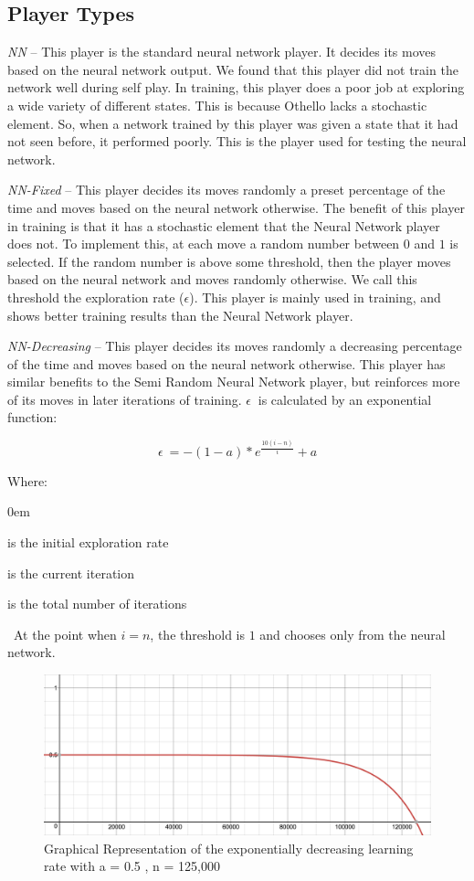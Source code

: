 \documentclass{sig-alternate-05-2015}
\begin{document}
\subsection{Player Types}
\emph{NN} -- This player is the standard neural network player. It decides its moves based on the neural network output. We found that this player did not train the network well during self play. In training, this player does a poor job at exploring a wide variety of different states. This is because Othello lacks a stochastic element. So, when a network trained by this player was given a state that it had not seen before, it performed poorly. This is the player used for testing the neural network.

\emph{NN-Fixed} -- This player decides its moves randomly a preset percentage of the time and moves based on the neural network otherwise. The benefit of this player in training is that it has a stochastic element that the Neural Network player does not. To implement this, at each move a random number between $0$ and $1$ is selected. If the random number is above some threshold, then the player moves based on the neural network and moves randomly otherwise. We call this threshold the exploration rate (\(\epsilon\)). This player is mainly used in training, and shows better training results than the Neural Network player.

\emph{NN-Decreasing} -- This player decides its moves randomly a decreasing percentage of the time and moves based on the neural network otherwise. This player has similar benefits to the Semi Random Neural Network player, but reinforces more of its moves in later iterations of training. $\epsilon\ $ is calculated by an exponential function:

\begin{equation}
\epsilon\ = -(1-a) * e^{ \frac{10(i-n)}{i} }+ a
\end{equation}

Where:
\begin{description}
\itemsep0em 
\item [a] is the initial exploration rate
\item [i] is the current iteration
\item [n] is the total number of iterations
\end{description} 
\
At the point when $i = n$, the threshold is $1$ and chooses only from the neural network.

\begin{figure}[h!]
  \includegraphics[width=\linewidth]{e-rate.png}
  \caption{Graphical Representation of the exponentially decreasing learning rate with a = 0.5 , n = 125,000 }
  \label{fig:neuron4}
\end{figure}
\end{document}

